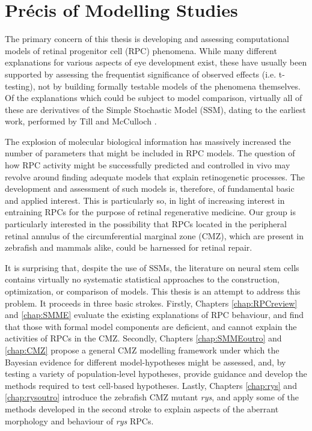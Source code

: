 \section*{Pr\'{e}cis of Modelling Studies}
\label{ch:precis}

The primary concern of this thesis is developing and assessing computational models of retinal progenitor cell (RPC) phenomena. While many different explanations for various aspects of eye development exist, these have usually been supported by assessing the frequentist significance of observed effects (i.e. t-testing), not by building formally testable models of the phenomena themselves. Of the explanations which could be subject to model comparison, virtually all of these are derivatives of the Simple Stochastic Model (SSM), dating to the earliest work, performed by Till and McCulloch \cite{Till1964}.

The explosion of molecular biological information has massively increased the number of parameters that might be included in RPC models. The question of how RPC activity might be successfully predicted and controlled in vivo may revolve around finding adequate models that explain retinogenetic processes. The development and assessment of such models is, therefore, of fundamental basic and applied interest. This is particularly so, in light of increasing interest in entraining RPCs for the purpose of retinal regenerative medicine. Our group is particularly interested in the possibility that RPCs located in the peripheral retinal annulus of the circumferential marginal zone (CMZ), which are present in zebrafish and mammals alike, could be harnessed for retinal repair.

It is surprising that, despite the use of SSMs, the literature on neural stem cells contains virtually no systematic statistical approaches to the construction, optimization, or comparison of models. This thesis is an attempt to address this problem. It proceeds in three basic strokes. Firstly, Chapters \ref{chap:RPCreview} and \ref{chap:SMME} evaluate the existing explanations of RPC behaviour, and find that those with formal model components are deficient, and cannot explain the activities of RPCs in the CMZ. Secondly, Chapters \ref{chap:SMMEoutro} and \ref{chap:CMZ} propose a general CMZ modelling framework under which the Bayesian evidence for different model-hypotheses might be assessed, and, by testing a variety of population-level hypotheses, provide guidance and develop the methods required to test cell-based hypotheses. Lastly, Chapters \ref{chap:rys} and \ref{chap:rysoutro} introduce the zebrafish CMZ mutant \textit{rys}, and apply some of the methods developed in the second stroke to explain aspects of the aberrant morphology and behaviour of \textit{rys} RPCs. 

